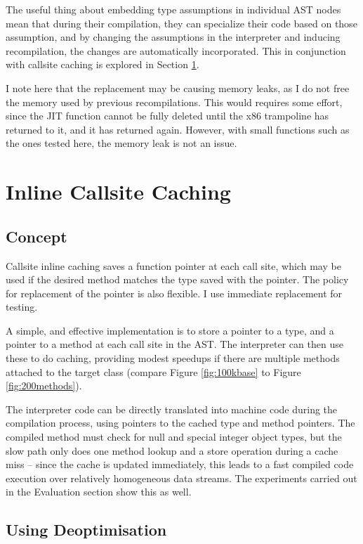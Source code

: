 \documentclass[journal,comsoc]{IEEEtran}
\begin{document}
	The useful thing about embedding type assumptions in individual AST nodes mean that during their compilation, they can specialize their code based on those assumption, and by changing the assumptions in the interpreter and inducing recompilation, the changes are automatically incorporated. This in conjunction with callsite caching is explored in Section \ref{sec:inlcache}.
	
	I note here that the replacement may be causing memory leaks, as I do not free the memory used by previous recompilations. This would requires some effort, since the JIT function cannot be fully deleted until the x86 trampoline has returned to it, and it has returned again. However, with small functions such as the ones tested here, the memory leak is not an issue.


\section{Inline Callsite Caching}
\label{sec:inlcache}
	\subsection{Concept}
		Callsite inline caching saves a function pointer at each call site, which may be used if the desired method matches the type saved with the pointer. The policy for replacement of the pointer is also flexible. I use immediate replacement for testing.
		
		A simple, and effective implementation is to store a pointer to a type, and a pointer to a method at each call site in the AST. The interpreter can then use these to do caching, providing modest speedups if there are multiple methods attached to the target class (compare Figure \ref{fig:100kbase} to Figure \ref{fig:200methods}).
		
		The interpreter code can be directly translated into machine code during the compilation process, using pointers to the cached type and method pointers. The compiled method must check for null and special integer object types, but the slow path only does one method lookup and a store operation during a cache miss -- since the cache is updated immediately, this leads to a fast compiled code execution over relatively homogeneous data streams. The experiments carried out in the Evaluation section show this as well.
		
	\subsection{Using Deoptimisation}
	
\end{document}
